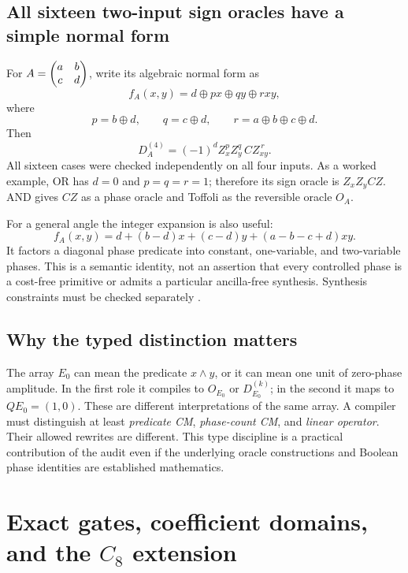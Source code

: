 \subsection{All sixteen two-input sign oracles have a simple normal form}
For $A=\begin{pmatrix}a&b\\c&d\end{pmatrix}$, write its algebraic normal form as
\begin{equation}
 f_A(x,y)=d\oplus p x\oplus q y\oplus rxy,
\end{equation}
where
\begin{equation}
 p=b\oplus d,\qquad q=c\oplus d,\qquad r=a\oplus b\oplus c\oplus d.
\end{equation}
Then
\begin{equation}\label{eq:ANForacle}
 D_A^{(4)}=(-1)^d Z_x^p Z_y^q\,CZ_{xy}^{\,r}.
\end{equation}
All sixteen cases were checked independently on all four inputs. As a worked example, OR has $d=0$ and $p=q=r=1$; therefore its sign oracle is $Z_xZ_yCZ$. AND gives $CZ$ as a phase oracle and Toffoli as the reversible oracle $O_A$.

For a general angle the integer expansion is also useful:
\begin{equation}
 f_A(x,y)=d+(b-d)x+(c-d)y+(a-b-c+d)xy.
\end{equation}
It factors a diagonal phase predicate into constant, one-variable, and two-variable phases. This is a semantic identity, not an assertion that every controlled phase is a cost-free primitive or admits a particular ancilla-free synthesis. Synthesis constraints must be checked separately \cite{giles,kmm}.

\subsection{Why the typed distinction matters}
The array $E_0$ can mean the predicate $x\land y$, or it can mean one unit of zero-phase amplitude. In the first role it compiles to $O_{E_0}$ or $D_{E_0}^{(k)}$; in the second it maps to $QE_0=(1,0)$. These are different interpretations of the same array. A compiler must distinguish at least \emph{predicate CM}, \emph{phase-count CM}, and \emph{linear operator}. Their allowed rewrites are different. This type discipline is a practical contribution of the audit even if the underlying oracle constructions and Boolean phase identities are established mathematics.

\section{Exact gates, coefficient domains, and the \texorpdfstring{$C_8$}{C8} extension}\label{sec:exact}
